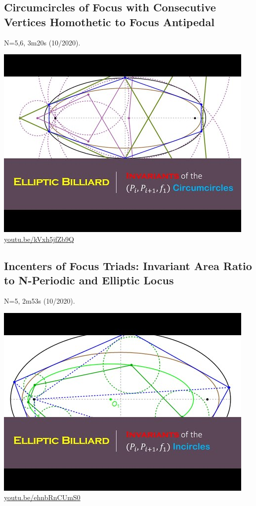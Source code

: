 \documentclass[12pt]{amsart}
\begin{document}
\subsection{Circumcircles of Focus with Consecutive Vertices Homothetic to Focus Antipedal}
\label{vid:kVxh5jfZb9Q}
\noindent N=5,6, 3m20s (10/2020). 
\begin{center}\includegraphics[width=.5\textwidth]{pics/kVxh5jfZb9Q.jpg} \\ 
\href{https://youtu.be/kVxh5jfZb9Q}{\url{youtu.be/kVxh5jfZb9Q}}\end{center}
% 

\subsection{Incenters of Focus Triads: Invariant Area Ratio to N-Periodic and Elliptic Locus}
\label{vid:ehnbRnCUmS0}
\noindent N=5, 2m53s (10/2020). 
\begin{center}\includegraphics[width=.5\textwidth]{pics/ehnbRnCUmS0.jpg} \\ 
\href{https://youtu.be/ehnbRnCUmS0}{\url{youtu.be/ehnbRnCUmS0}}\end{center}
% 
\end{document}

